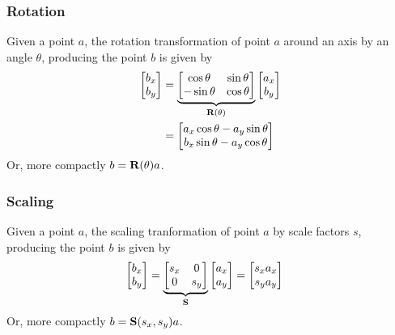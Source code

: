 \documentclass[11pt]{article}
\begin{document}
\begin{multicols}{2}
    \subsubsection{Rotation}
    Given a point $a$, the rotation transformation of point $a$ around an axis
    by an angle $\theta$, producing the point $b$ is given by
    \small
    \begin{align}
        \begin{bmatrix}
            b_x \\
            b_y
        \end{bmatrix}
        &=
        \underbrace{
        \begin{bmatrix}
            \cos \theta     & \sin \theta \\
            -\sin \theta    & \cos \theta
        \end{bmatrix}}_{\text{\bf R}(\theta)}
        \begin{bmatrix}
            a_x \\
            b_y
        \end{bmatrix} \\ \nonumber
        &=
        \begin{bmatrix}
            a_x \cos \theta - a_y \sin \theta \\
            b_x \sin \theta - a_y \cos \theta
        \end{bmatrix}
    \end{align}
    \normalsize
    Or, more compactly $b = \text{\bf R}(\theta) a$.
    
    \vfill\columnbreak
    
    \subsubsection{Scaling}
    Given a point $a$, the scaling tranformation of point $a$ by scale factors
    $s$, producing the point $b$ is given by
    \small
    \begin{align}
        \begin{bmatrix}
            b_x \\
            b_y
        \end{bmatrix}
        &=
        \underbrace{
        \begin{bmatrix}
            s_x & 0 \\
            0   & s_y
        \end{bmatrix}}_{\text{\bf S}}
        \begin{bmatrix}
            a_x \\
            a_y
        \end{bmatrix}
        =
        \begin{bmatrix}
            s_x a_x \\
            s_y a_y
        \end{bmatrix}
    \end{align}
    \normalsize
    Or, more compactly $b = \text{\bf S}(s_x, s_y) a$.
    

\end{multicols}
\end{document}
